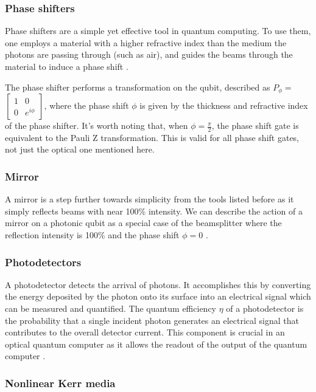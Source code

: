 \subsubsection{Phase shifters}
Phase shifters are a simple yet effective tool in quantum computing. To use them, one employs a material with a higher refractive index than the medium the photons are passing through (such as air), and guides the beams through the material to induce a phase shift \cite{nielsen_chuang_2010}. 

The phase shifter performs a transformation on the qubit, described as $P_\phi = $ $\begin{bmatrix}
1 & 0 \\
0 & e^{i\phi}
\end{bmatrix}$, where the phase shift $\phi$ is given by the thickness and refractive index of the phase shifter. It's worth noting that, when $\phi = \frac{\pi}{2}$, the phase shift gate is equivalent to the Pauli Z transformation. This is valid for all phase shift gates, not just the optical one mentioned here.

\subsubsection{Mirror}
A mirror is a step further towards simplicity from the tools listed before as it simply reflects beams with near 100\% intensity. We can describe the action of a mirror on a photonic qubit as a special case of the beamsplitter where the reflection intensity is 100\% and the phase shift $\phi = 0$  \cite{nielsen_chuang_2010}.

\subsubsection{Photodetectors}
A photodetector detects the arrival of photons. It accomplishes this by converting the energy deposited by the photon onto its surface into an electrical signal which can be measured and quantified. The quantum efficiency $\eta$ of a photodetector is the probability that a single incident photon generates an electrical signal that contributes to the overall detector current. This component is crucial in an optical quantum computer as it allows the readout of the output of the quantum computer \cite{nielsen_chuang_2010}. 


\subsubsection{Nonlinear Kerr media}

